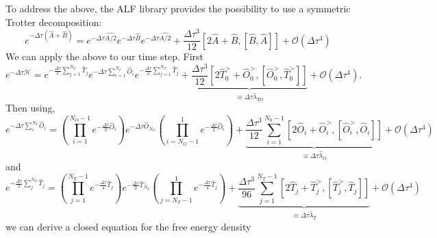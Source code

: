 To   address the above,  the ALF library provides the possibility to use a symmetric Trotter decomposition: 
\begin{equation}
	e^{ -\Delta \tau \left( \hat{A} + \hat{B} \right)  }  =  e^{ -\Delta \tau \hat{A/2}}  e^{ -\Delta \tau  \hat{B}  }   e^{ -\Delta \tau \hat{A/2}}  +  \frac{\Delta  \tau^3}{12} \left[ 2\hat{A} + \hat{B}, \left[\hat{B}, \hat{A} \right]\right] + \mathcal{O} \left (\Delta \tau ^4 \right)  
\end{equation}
We can apply   the above to our  time  step.  First
\begin{equation}
	e^{-\Delta \tau \mathcal{H}}    =       e^{-\frac{\Delta \tau}{2} \sum_{j=1}^{N_T} \hat{T}_j } e^{-\Delta \tau \sum_{i=1}^{N_I} \hat{O}_i } e^{-\frac{\Delta \tau}{2} \sum_{j=1}^{N_T} \hat{T}_j }   
	 +  \underbrace{\frac{\Delta \tau ^3}{12}   \left[ 2\hat{T}^{>}_0 + \hat{O}^{>}_0, \left[\hat{O}^{>}_{0}, \hat{T}^{>}_0 \right]\right] }_{\equiv \Delta \tau \hat{\lambda}_{TO}}   + \mathcal{O}\left(  \Delta \tau^4 \right).
\end{equation}
Then using,
\begin{equation}
 e^{-\Delta \tau \sum_{i}^{N_I} \hat{O}_i }  =  \left(\prod_{i=1}^{N_O-1} e^{-\frac{\Delta \tau}{2} \hat{O}_i } \right)    e^{-\Delta \tau \hat{O}_{N_O} }    
   \left(  \prod_{i=N_O-1}^{1} e^{-\frac{\Delta \tau}{2} \hat{O}_i } \right)   + 
  \underbrace{\frac{\Delta \tau ^3}{12}  \sum_{i=1}^{N_0-1} \left[ 2\hat{O}_i + \hat{O}^{>}_i, \left[\hat{O}^{>}_{i}, \hat{O}_i \right]\right] }_{\equiv \Delta \tau \hat{\lambda}_{O}}    + \mathcal{O}\left(  \Delta  \tau^4 \right) 
\end{equation}
and 
\begin{equation}
 e^{- \frac{\Delta \tau}{2} \sum_{j}^{N_T} \hat{T}_j }  =  \left(\prod_{j=1}^{N_T-1} e^{-\frac{\Delta \tau}{4} \hat{T}_j } \right)    e^{-\frac{\Delta \tau}{2} \hat{T}_{N_T} }    
   \left(  \prod_{j=N_T-1}^{1} e^{-\frac{\Delta \tau}{4} \hat{T}_j } \right)   + 
  \underbrace{\frac{\Delta \tau ^3}{96}  \sum_{j=1}^{N_T-1} \left[ 2\hat{T}_j + \hat{T}^{>}_j, \left[\hat{T}^{>}_{j}, \hat{T}_j \right]\right] }_{\equiv \Delta \tau \hat{\lambda}_{T}}    + \mathcal{O}\left(  \Delta  \tau^4 \right) 
\end{equation}
we can derive  a  closed equation  for  the free energy density
